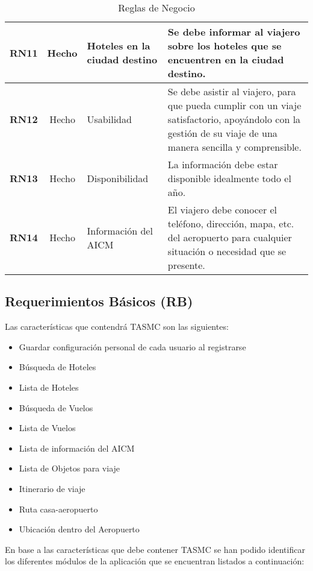 \begin{table}
\begin{center}
\begin{tabular}{|c|c|p{3cm}|p{5.7cm}|}
			\hline 
				\textbf{RN11} &
				Hecho &
				Hoteles en la ciudad destino &
				Se debe informar al viajero sobre los hoteles que se encuentren en la ciudad destino.  \\ 
			\hline \rowcolor[RGB]{240,248,255}
				\textbf{RN12} &
				Hecho &
				Usabilidad &
				Se debe asistir al viajero, para que pueda cumplir con un viaje satisfactorio, apoyándolo con la gestión de su viaje de una manera sencilla y comprensible.  \\ 
			\hline 
				\textbf{RN13} &
				Hecho &
				Disponibilidad &
				La información debe estar disponible idealmente todo el año.  \\ 
			\hline \rowcolor[RGB]{240,248,255}
				\textbf{RN14} &
				Hecho &
				Información del AICM &
				El viajero debe conocer el teléfono, dirección, mapa, etc. del aeropuerto para cualquier situación o necesidad que se presente. \\ 
			\hline 
		\end{tabular}
	\end{center}
	\caption[Reglas de Negocio]{Reglas de Negocio} 
	\label{tab:reglasNegocio}
\end{table}

\subsection{Requerimientos Básicos (RB)}

Las características que contendrá TASMC son las siguientes:

\begin{itemize}
	\item Guardar configuración personal de cada usuario al registrarse
	\item Búsqueda de Hoteles
	\item Lista de Hoteles
	\item Búsqueda de Vuelos
	\item Lista de Vuelos
	\item Lista de información del AICM
	\item Lista de Objetos para viaje
	\item Itinerario de viaje
	\item Ruta casa-aeropuerto
	\item Ubicación dentro del Aeropuerto
\end{itemize}

En base a las características que debe contener TASMC se han podido identificar los diferentes módulos de la aplicación que se encuentran listados a continuación:

